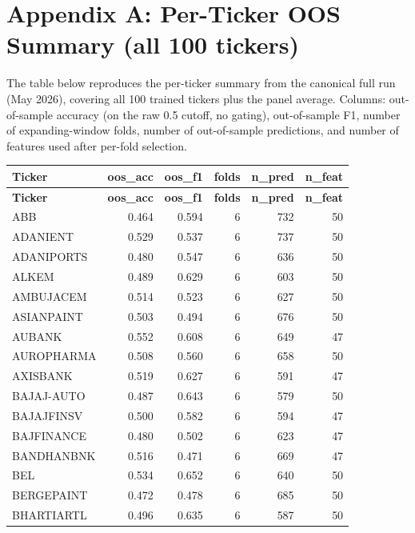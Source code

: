 \appendix
{}
\chapter*{Appendix A: Per-Ticker OOS Summary (all 100 tickers)}

The table below reproduces the per-ticker summary from the canonical full run (May 2026), covering all 100 trained tickers plus the panel average. Columns: out-of-sample accuracy (on the raw 0.5 cutoff, no gating), out-of-sample F1, number of expanding-window folds, number of out-of-sample predictions, and number of features used after per-fold selection.

\begin{small}
\begin{longtable}{l r r r r r}
\toprule
\textbf{Ticker} & \textbf{oos\_acc} & \textbf{oos\_f1} & \textbf{folds} & \textbf{n\_pred} & \textbf{n\_feat} \\
\midrule
\endfirsthead
\toprule
\textbf{Ticker} & \textbf{oos\_acc} & \textbf{oos\_f1} & \textbf{folds} & \textbf{n\_pred} & \textbf{n\_feat} \\
\midrule
\endhead
\bottomrule
\endfoot
ABB         & 0.464 & 0.594 & 6 & 732 & 50 \\
ADANIENT    & 0.529 & 0.537 & 6 & 737 & 50 \\
ADANIPORTS  & 0.480 & 0.547 & 6 & 636 & 50 \\
ALKEM       & 0.489 & 0.629 & 6 & 603 & 50 \\
AMBUJACEM   & 0.514 & 0.523 & 6 & 627 & 50 \\
ASIANPAINT  & 0.503 & 0.494 & 6 & 676 & 50 \\
AUBANK      & 0.552 & 0.608 & 6 & 649 & 47 \\
AUROPHARMA  & 0.508 & 0.560 & 6 & 658 & 50 \\
AXISBANK    & 0.519 & 0.627 & 6 & 591 & 47 \\
BAJAJ-AUTO  & 0.487 & 0.643 & 6 & 579 & 50 \\
BAJAJFINSV  & 0.500 & 0.582 & 6 & 594 & 47 \\
BAJFINANCE  & 0.480 & 0.502 & 6 & 623 & 47 \\
BANDHANBNK  & 0.516 & 0.471 & 6 & 669 & 47 \\
BEL         & 0.534 & 0.652 & 6 & 640 & 50 \\
BERGEPAINT  & 0.472 & 0.478 & 6 & 685 & 50 \\
BHARTIARTL  & 0.496 & 0.635 & 6 & 587 & 50 \\

\end{longtable}
\end{small}
